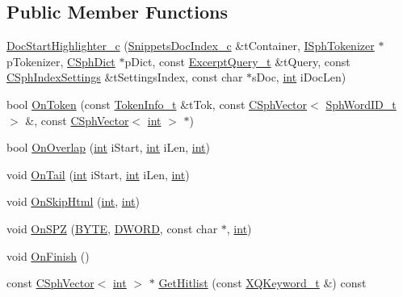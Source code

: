 \subsection*{Public Member Functions}
\begin{DoxyCompactItemize}
\item 
\hyperlink{classDocStartHighlighter__c_afd69871156aa9081fd29bc9ee93b48de}{Doc\-Start\-Highlighter\-\_\-c} (\hyperlink{classSnippetsDocIndex__c}{Snippets\-Doc\-Index\-\_\-c} \&t\-Container, \hyperlink{classISphTokenizer}{I\-Sph\-Tokenizer} $\ast$p\-Tokenizer, \hyperlink{classCSphDict}{C\-Sph\-Dict} $\ast$p\-Dict, const \hyperlink{structExcerptQuery__t}{Excerpt\-Query\-\_\-t} \&t\-Query, const \hyperlink{structCSphIndexSettings}{C\-Sph\-Index\-Settings} \&t\-Settings\-Index, const char $\ast$s\-Doc, \hyperlink{sphinxexpr_8cpp_a4a26e8f9cb8b736e0c4cbf4d16de985e}{int} i\-Doc\-Len)
\item 
bool \hyperlink{classDocStartHighlighter__c_a8fddb562026ed564c52f80acd4ce40c6}{On\-Token} (const \hyperlink{structTokenInfo__t}{Token\-Info\-\_\-t} \&t\-Tok, const \hyperlink{classCSphVector}{C\-Sph\-Vector}$<$ \hyperlink{sphinx_8h_a80a94d5984fdf9214a98f3e5e65df963}{Sph\-Word\-I\-D\-\_\-t} $>$ \&, const \hyperlink{classCSphVector}{C\-Sph\-Vector}$<$ \hyperlink{sphinxexpr_8cpp_a4a26e8f9cb8b736e0c4cbf4d16de985e}{int} $>$ $\ast$)
\item 
bool \hyperlink{classDocStartHighlighter__c_ae60e3b937a707c59ee72501edb7a75b6}{On\-Overlap} (\hyperlink{sphinxexpr_8cpp_a4a26e8f9cb8b736e0c4cbf4d16de985e}{int} i\-Start, \hyperlink{sphinxexpr_8cpp_a4a26e8f9cb8b736e0c4cbf4d16de985e}{int} i\-Len, \hyperlink{sphinxexpr_8cpp_a4a26e8f9cb8b736e0c4cbf4d16de985e}{int})
\item 
void \hyperlink{classDocStartHighlighter__c_a0b69de94a9cd60274db8ba69a2fcbf22}{On\-Tail} (\hyperlink{sphinxexpr_8cpp_a4a26e8f9cb8b736e0c4cbf4d16de985e}{int} i\-Start, \hyperlink{sphinxexpr_8cpp_a4a26e8f9cb8b736e0c4cbf4d16de985e}{int} i\-Len, \hyperlink{sphinxexpr_8cpp_a4a26e8f9cb8b736e0c4cbf4d16de985e}{int})
\item 
void \hyperlink{classDocStartHighlighter__c_a8fd3c19a2ace0a2685e794f250456b98}{On\-Skip\-Html} (\hyperlink{sphinxexpr_8cpp_a4a26e8f9cb8b736e0c4cbf4d16de985e}{int}, \hyperlink{sphinxexpr_8cpp_a4a26e8f9cb8b736e0c4cbf4d16de985e}{int})
\item 
void \hyperlink{classDocStartHighlighter__c_a28233931c0afbc819a1b3dee2e32726f}{On\-S\-P\-Z} (\hyperlink{sphinxstd_8h_a4ae1dab0fb4b072a66584546209e7d58}{B\-Y\-T\-E}, \hyperlink{sphinxstd_8h_a798af1e30bc65f319c1a246cecf59e39}{D\-W\-O\-R\-D}, const char $\ast$, \hyperlink{sphinxexpr_8cpp_a4a26e8f9cb8b736e0c4cbf4d16de985e}{int})
\item 
void \hyperlink{classDocStartHighlighter__c_a1db75b85f5bafe580cc843e265441392}{On\-Finish} ()
\item 
const \hyperlink{classCSphVector}{C\-Sph\-Vector}$<$ \hyperlink{sphinxexpr_8cpp_a4a26e8f9cb8b736e0c4cbf4d16de985e}{int} $>$ $\ast$ \hyperlink{classDocStartHighlighter__c_ad331c85339a49eeb8074c6e5bcb9e36d}{Get\-Hitlist} (const \hyperlink{structXQKeyword__t}{X\-Q\-Keyword\-\_\-t} \&) const 
\end{DoxyCompactItemize}

